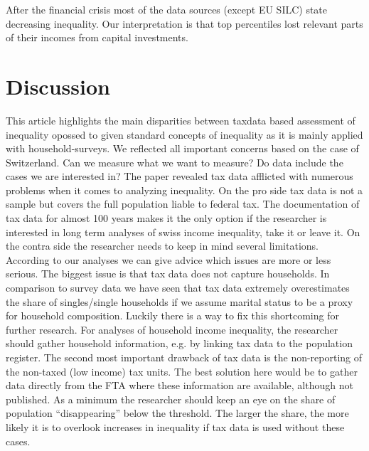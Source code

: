 \documentclass[twoside]{article}\usepackage[]{graphicx}\usepackage[]{color}
\begin{document}
\begin{multicols}{2}
After the financial crisis most of the data sources (except EU SILC) state decreasing inequality. Our interpretation is that top percentiles lost relevant parts of their incomes from capital investments. 




\section{Discussion}

This article highlights the main disparities between taxdata based assessment of inequality opossed to given standard concepts of inequality as it is mainly applied with household-surveys. We reflected all important concerns based on the case of Switzerland. Can we measure what we want to measure? Do data include the cases we are interested in? The paper revealed tax data afflicted with numerous problems when it comes to analyzing inequality. On the pro side tax data is not a sample but covers the full population liable to federal tax. The documentation of tax data for almost 100 years makes it the only option if the researcher is interested in long term analyses of swiss income inequality, take it or leave it. On the contra side the researcher needs to keep in mind several limitations. According to our analyses we can give advice which issues are more or less serious. The biggest issue is that tax data does not capture households. In comparison to survey data we have seen that tax data extremely overestimates the share of singles/single households if we assume marital status to be a proxy for household composition. Luckily there is a way to fix this shortcoming for further research. For analyses of household income inequality, the researcher should gather household information, e.g. by linking tax data to the population register. The second most important drawback of tax data is the non-reporting of the non-taxed (low income) tax units. The best solution here would be to gather data directly from the FTA where these information are available, although not published. As a minimum the researcher should keep an eye on the share of population ``disappearing'' below the threshold. The larger the share, the more likely it is to overlook increases in inequality if tax data is used without these cases. 

\end{multicols}
\end{document}

